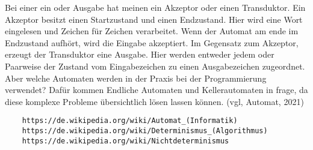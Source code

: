Bei einer ein oder Ausgabe hat meinen ein Akzeptor oder einen Transduktor. Ein Akzeptor besitzt einen Startzustand und einen Endzustand. Hier wird eine Wort eingelesen und Zeichen für Zeichen verarbeitet. Wenn der Automat am ende im Endzustand aufhört, wird die Eingabe akzeptiert. Im Gegensatz zum Akzeptor, erzeugt der Transduktor eine Ausgabe. Hier werden entweder jedem oder Paarweise der Zustand vom Eingabezeichen zu einen Ausgabezeichen zugeordnet. 
Aber welche Automaten werden in der Praxis bei der Programmierung verwendet? Dafür kommen Endliche Automaten und Kellerautomaten in frage, da diese komplexe Probleme übersichtlich lösen lassen können. (vgl, Automat, 2021) 

\begin{lstlisting}
	https://de.wikipedia.org/wiki/Automat_(Informatik)
	https://de.wikipedia.org/wiki/Determinismus_(Algorithmus)
	https://de.wikipedia.org/wiki/Nichtdeterminismus
\end{lstlisting}